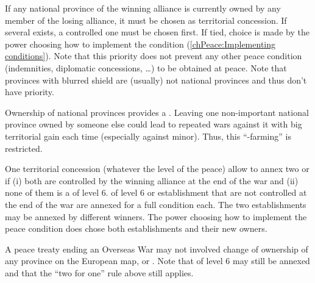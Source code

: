 \aparag[Priority] If any national province of the winning alliance is
currently owned by any member of the losing alliance, it must be chosen as
territorial concession.
\bparag If several exists, a controlled one must be chosen first.
\bparag If tied, choice is made by the power choosing how to implement the
condition (\ref{chPeace:Implementing conditions}).
\bparag Note that this priority does not prevent any other peace condition
(indemnities, diplomatic concessions, \ldots) to be obtained at peace.
\bparag Note that provinces with blurred shield are (usually) not national
provinces and thus don't have priority.

\begin{designnote}
  Ownership of national provinces provides a \CB. Leaving one non-important
  national province owned by someone else could lead to repeated wars against
  it with big territorial gain each time (especially against minor). Thus,
  this ``\CB-farming'' is restricted.
\end{designnote}

\bparag One territorial concession (whatever the level of the peace) allow to
annex two \COL or \TP if (i) both are controlled by the winning alliance at
the end of the war and (ii) none of them is a \COL of level 6.
\bparag \COL of level 6 or establishment that are not controlled at the end of
the war are annexed for a full condition each.
\bparag The two establishments may be annexed by different winners.
\bparag The power choosing how to implement the peace condition does chose
both establishments and their new owners.

A peace treaty ending an Overseas War may not involved change of ownership of
any province on the European map,  or .
\bparag Note that \COL of level 6 may still be annexed and that the ``two for
one'' rule above still applies.

